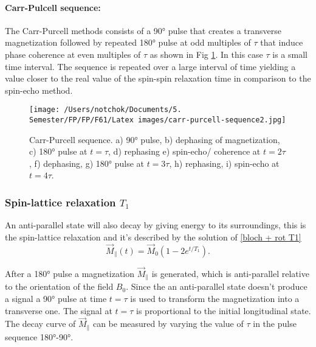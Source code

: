 \paragraph{Carr-Pulcell sequence: }
The Carr-Purcell methods consists of a 90° pulse that creates a transverse magnetization followed by repeated 180° pulse at odd multiples of $\tau$ that induce phase coherence at even multiples of $\tau$ as shown in Fig \ref{fig: carr-purcell sequence}. In this case $\tau$ is a small time interval. 
The sequence is repeated over a large interval of time yielding a value closer to the real value of the spin-spin relaxation time in comparison to the spin-echo method.
\begin{figure}[!htbp]
 \begin{center}
  \texttt{[image: /Users/notchok/Documents/5. Semester/FP/FP/F61/Latex images/carr-purcell-sequence2.jpg]} 
  \caption[]{ Carr-Purcell sequence. a) 90° pulse, b) dephasing of magnetization, c) 180° pulse at $t = \tau$, d) rephasing e) spin-echo/ coherence at $t = 2\tau$, f) dephasing, g) 180° pulse at $t = 3 \tau$, h) rephasing, i) spin-echo at $t = 4\tau$.  \footnotemark}
  \label{fig: carr-purcell sequence}
 \end{center}
\end{figure}

\subsubsection{Spin-lattice relaxation $T_1$}
An anti-parallel state will also decay by giving energy to its surroundings, this is the spin-lattice relaxation and it's described by  the solution of \ref{bloch + rot T1}
\begin{equation}
\label{eq: sol. bloch T1}
\vec{M}_\parallel(t) = \vec{M}_0\left( 1 - 2e^{t/T_1}\right).
\end{equation}

After a 180° pulse a magnetization $\vec{M}_\parallel$ is generated, which is anti-parallel relative to the orientation of the field $B_0$. Since the an anti-parallel state doesn't produce a signal a 90° pulse at time $t = \tau$ is used to transform the magnetization into a transverse one. The signal at $t = \tau$ is proportional to the initial longitudinal state. The decay curve of $\vec{M}_\parallel$ can be measured by varying the value of $\tau$ in the pulse sequence 180°-90°. 
